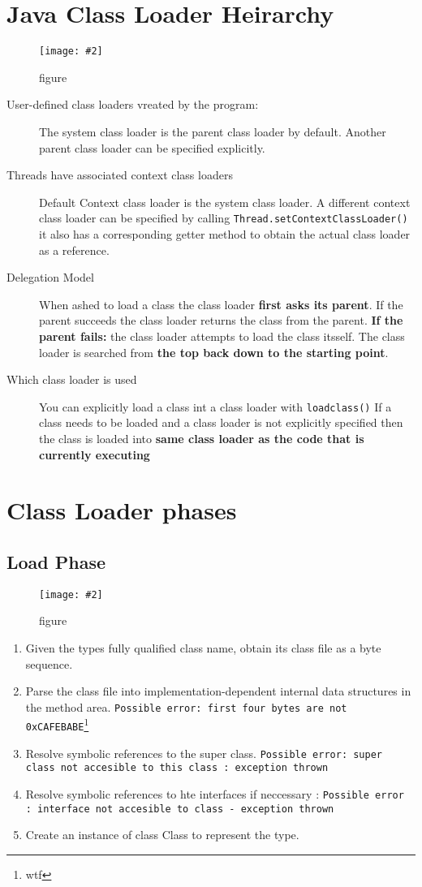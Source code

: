 \documentclass[a4paper,10pt]{scrreprt}
\newcommand{\pic}[2][figure]{\begin{figure}[h]
 \centering
 \texttt{[image: \#2]}
 \caption{#1}
\end{figure}
}
\begin{document}
\section{Java Class Loader Heirarchy}
\pic{jclh.png}
\begin{description}
 \item [User-defined class loaders vreated by the program:] The system class loader is the parent class loader by 
default. Another parent class loader can be specified explicitly. 
\item[Threads have associated context class loaders] Default Context class loader is the system class loader. A 
different context class loader can be specified by calling \texttt{Thread.setContextClassLoader()} it also has a 
corresponding getter method to obtain the actual class loader as a reference. 
\item[Delegation Model] When ashed to load a class the class loader \textbf{first asks its parent}. If the parent 
succeeds the class loader returns the class from the parent. \textbf{If the parent fails:} the class loader attempts to 
load the class itsself. The class loader is searched from \textbf{the top back down to the starting point}.
\item[Which class loader is used] You can explicitly load a class int a class loader with \texttt{loadclass()} If a 
class needs to be loaded and a class loader is not explicitly specified then the class is loaded into \textbf{same 
class loader as the code that is currently executing}
\end{description}

\section{Class Loader phases}
\subsection{Load Phase}
\pic{lp.png}
\begin{enumerate}
 \item Given the types fully qualified class name, obtain its class file as a byte sequence.
 \item Parse the class file into implementation-dependent internal data structures in the method area.
 \texttt{Possible error: first four bytes are not 0xCAFEBABE}\footnote{wtf}
 \item Resolve symbolic references to the super class.
 \texttt{Possible error: super class not accesible to this class : exception thrown}
 \item Resolve symbolic references to hte interfaces if neccessary : \texttt{Possible error : interface not accesible 
to class - exception thrown}
\item Create an instance of class Class to represent the type.
\end{enumerate}
\end{document}
